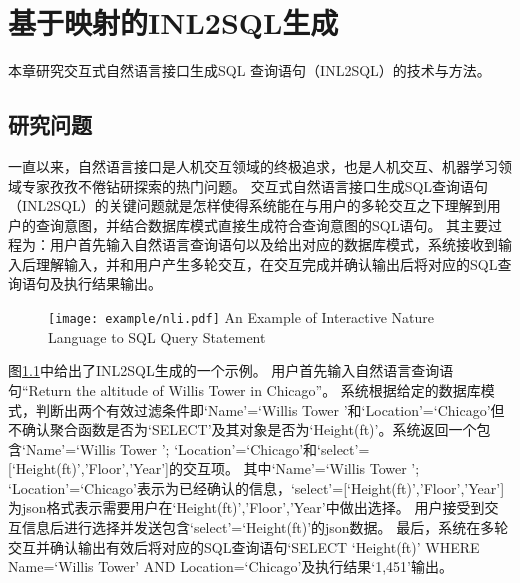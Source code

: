 \chapter{基于映射的INL2SQL生成}
\label{chap:interaction}
本章研究交互式自然语言接口生成SQL 查询语句（INL2SQL）的技术与方法。

\section{研究问题}

一直以来，自然语言接口是人机交互领域的终极追求，也是人机交互、机器学习领域专家孜孜不倦钻研探索的热门问题。
交互式自然语言接口生成SQL查询语句（INL2SQL）的关键问题就是怎样使得系统能在与用户的多轮交互之下理解到用户的查询意图，并结合数据库模式直接生成符合查询意图的SQL语句。
其主要过程为：用户首先输入自然语言查询语句以及给出对应的数据库模式，系统接收到输入后理解输入，并和用户产生多轮交互，在交互完成并确认输出后将对应的SQL查询语句及执行结果输出。

\begin{figure}[!htp]
  \centering
  \texttt{[image: example/nli.pdf]}
    {An Example of Interactive Nature Language to SQL Query Statement}
  \label{fig:NLI}
\end{figure}

图\ref{fig:NLI}中给出了INL2SQL生成的一个示例。
用户首先输入自然语言查询语句“Return the altitude of Willis Tower in Chicago”。
系统根据给定的数据库模式，判断出两个有效过滤条件即‘Name’=‘Willis Tower ’和‘Location’=‘Chicago’但不确认聚合函数是否为‘SELECT’及其对象是否为‘Height(ft)’。系统返回一个包含{‘Name’=‘Willis Tower ’; ‘Location’=‘Chicago’}和{‘select’=[‘Height(ft)’,’Floor’,’Year’]}的交互项。
其中{‘Name’=‘Willis Tower ’; ‘Location’=‘Chicago’}表示为已经确认的信息，{‘select’=[‘Height(ft)’,’Floor’,’Year’]}为json格式表示需要用户在‘Height(ft)’,’Floor’,’Year’中做出选择。
用户接受到交互信息后进行选择并发送包含{‘select’=‘Height(ft)’}的json数据。
最后，系统在多轮交互并确认输出有效后将对应的SQL查询语句‘SELECT ‘Height(ft)’ WHERE Name=‘Willis Tower’ AND Location=‘Chicago’及执行结果‘1,451’输出。



